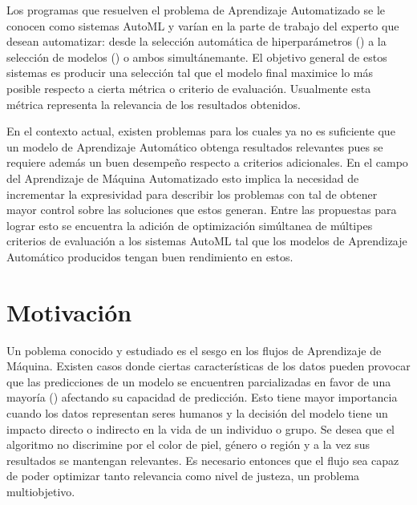 Los programas que resuelven el problema de Aprendizaje Automatizado se le conocen como sistemas AutoML y var\'ian en la parte de trabajo del experto que desean automatizar: desde la selecci\'on autom\'atica de hiperpar\'ametros (\cite{feurer2019hyperparameter}) a  la selecci\'on de modelos (\cite{thornton2013auto}) o ambos  simult\'anemante. El objetivo general de estos sistemas es producir una selecci\'on tal que el modelo final maximice lo m\'as posible respecto a cierta m\'etrica o criterio de evaluaci\'on. Usualmente esta m\'etrica representa la relevancia de los resultados obtenidos.

En el contexto actual, existen problemas para los cuales ya no es suficiente que un modelo de Aprendizaje Autom\'atico obtenga resultados relevantes pues se requiere adem\'as un buen desempe\~no respecto a criterios adicionales. En el campo del Aprendizaje de M\'aquina Automatizado esto implica la necesidad de incrementar la expresividad para describir los problemas con tal de obtener mayor control sobre las soluciones que estos generan. Entre las propuestas  para lograr esto se encuentra la adici\'on  de optimizaci\'on sim\'ultanea de m\'ultipes criterios de evaluaci\'on a los sistemas AutoML  tal que los modelos de Aprendizaje Autom\'atico producidos tengan buen rendimiento en estos.   

\section*{Motivaci\'on}
Un poblema conocido y estudiado es el sesgo en los flujos de Aprendizaje de M\'aquina. Existen casos donde ciertas caracter\'isticas de los datos pueden provocar que las predicciones de un modelo se encuentren parcializadas en favor de una mayor\'ia  (\cite{mehrabi2021survey}) afectando su capacidad de predicci\'on. Esto tiene mayor importancia cuando los datos representan seres humanos y la decisi\'on del modelo tiene un impacto directo o indirecto en la vida de un individuo o grupo. Se desea que el algoritmo no discrimine por el color de piel, g\'enero o regi\'on y a la vez sus resultados se mantengan relevantes. Es necesario entonces que el flujo sea capaz de poder optimizar tanto  relevancia como  nivel de justeza, un problema multiobjetivo.

